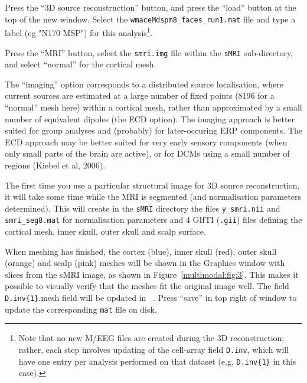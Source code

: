 Press the ``3D source reconstruction'' button, and press the ``load'' button at the top of the new window. Select the \verb!wmaceMdspm8_faces_run1.mat! file and type a label (eg "N170 MSP") for this analysis\footnote{Note that no new M/EEG files are created during the 3D reconstruction; rather, each step involves updating of the cell-array field \texttt{D.inv}, which will have one entry per analysis performed on that dataset (e.g, \texttt{D.inv\{1\}} in this case).}.

Press the ``MRI'' button, select the \texttt{smri.img} file within the \texttt{sMRI} sub-directory, and select ``normal'' for the cortical mesh.

The ``imaging'' option corresponds to a distributed source localisation, where current sources are estimated at a large number of fixed points (8196 for a ``normal'' mesh here) within a cortical mesh, rather than approximated by a small number of equivalent dipoles (the ECD option). The imaging  approach is better suited for group analyses and (probably) for later-occuring ERP components. The ECD approach may be better suited for very early sensory components (when only small parts of the brain are active), or for DCMs using a small number of regions (Kiebel et al, 2006).

The first time you use a particular structural image for 3D source reconstruction, it will take some time while the MRI is segmented (and normalisation parameters determined). This will create in the \texttt{sMRI} directory the files \texttt{y\_smri.nii} and \texttt{smri\_seg8.mat} for normalisation parameters and 4 GIfTI (\texttt{.gii}) files defining the cortical mesh, inner skull, outer skull and scalp surface.

When meshing has finished, the cortex (blue), inner skull (red), outer skull (orange) and scalp (pink) meshes will be shown in the Graphics window with slices from the sMRI image, as shown in Figure~\ref{multimodal:fig:3}. This makes it possible to visually verify that the meshes fit the original image well. The field \texttt{D.inv\{1\}}.mesh field will be updated in \matlab\ . Press ``save'' in top right of window to update the corresponding \texttt{mat} file on disk.


